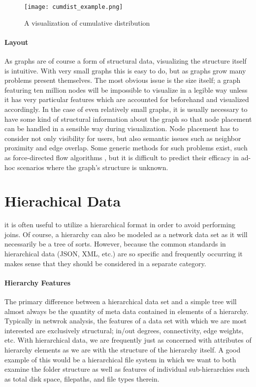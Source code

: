 \begin{figure}
	\centering
	\texttt{[image: cumdist\_example.png]}
	\caption{A visualization of cumulative distribution \citep{KONECT}}
	\label{fig:cumdist}
\end{figure}

\paragraph{Layout}
As graphs are of course a form of structural data, visualizing the structure itself is intuitive. With very small graphs this is easy to do, but as graphs grow many problems present themselves. The most obvious issue is the size itself; a graph featuring ten million nodes will be impossible to visualize in a legible way unless it has very particular features which are accounted for beforehand and visualized accordingly. In the case of even relatively small graphs, it is usually necessary to have some kind of structural information about the graph so that node placement can be handled in a sensible way during visualization. Node placement has to consider not only visibility for users, but also semantic issues such as neighbor proximity and edge overlap. Some generic methods for such problems exist, such as force-directed flow algorithms \citep{Didimo2011}, but it is difficult to predict their efficacy in ad-hoc scenarios where the graph's structure is unknown.
 

\section{Hierachical Data}
\label{sec:hierarchical}
 it is often useful to utilize a hierarchical format in order to avoid performing joins. Of course, a hierarchy can also be modeled as a network data set as it will necessarily be a tree of sorts. However, because the common standards in hierarchical data (JSON, XML, etc.) are so specific and frequently occurring it makes sense that they should be considered in a separate category.

\paragraph{Hierarchy Features}
The primary difference between a hierarchical data set and a simple tree will almost always be the quantity of meta data contained in elements of a hierarchy. Typically in netwrok analysis, the features of a data set with which we are most interested are exclusively structural; in/out degrees, connectivity, edge weights, etc. With hierarchical data, we are frequently just as concerned with attributes of hierarchy elements as we are with the structure of the hierarchy itself. A good example of this would be a hierarchical file system in which we want to both examine the folder structure as well as features of individual sub-hierarchies such as total disk space, filepaths, and file types therein. 

